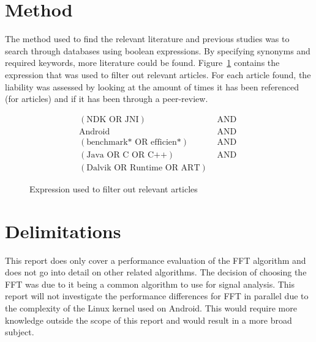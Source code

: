 \section{Method}

The method used to find the relevant literature and previous studies was to search through databases using boolean expressions. By specifying synonyms and required keywords, more literature could be found. Figure~\ref{fig:db:search} contains the expression that was used to filter out relevant articles. For each article found, the liability was assessed by looking at the amount of times it has been referenced (for articles) and if it has been through a peer-review.

\begin{figure}
    \centering
    \begin{align*}
        (\text{NDK OR JNI})               & \text{ AND } \\
        \text{Android}                    & \text{ AND } \\
        (\text{benchmark* OR efficien*})  & \text{ AND } \\
        (\text{Java OR C OR C++})         & \text{ AND } \\
        (\text{Dalvik OR Runtime OR ART}) &
    \end{align*}
    \caption{Expression used to filter out relevant articles}
    \label{fig:db:search}
\end{figure}


\section{Delimitations}
This report does only cover a performance evaluation of the FFT algorithm and does not go into detail on other related algorithms. The decision of choosing the FFT was due to it being a common algorithm to use for signal analysis. This report will not investigate the performance differences for FFT in parallel due to the complexity of the Linux kernel used on Android. This would require more knowledge outside the scope of this report and would result in a more broad subject.

